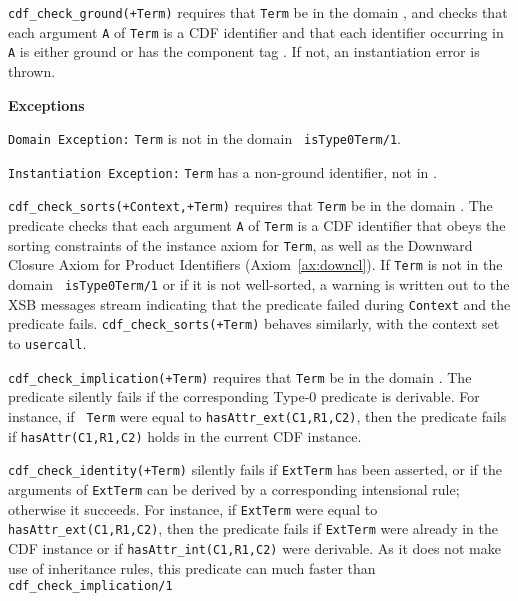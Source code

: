 \begin{description}
{\tt cdf\_check\_ground(+Term)} requires that {\tt Term} be in the
domain , and checks that each argument {\tt A}
of {\tt Term} is a CDF identifier and that each identifier occurring
in {\tt A} is either ground or has the component tag
.  If not, an instantiation error is thrown.

{\bf Exceptions} 

{\tt Domain Exception:} {\tt Term} is not in the domain {\tt
isType0Term/1}.

{\tt Instantiation Exception:} {\tt Term} has a non-ground identifier,
not in .



{\tt cdf\_check\_sorts(+Context,+Term)} requires that {\tt Term} be in
the domain .  The predicate checks that each
argument {\tt A} of {\tt Term} is a CDF identifier that obeys the
sorting constraints of the instance axiom for {\tt Term}, as well as
the Downward Closure Axiom for Product Identifiers
(Axiom~\ref{ax:downcl}).  If {\tt Term} is not in the domain {\tt
isType0Term/1} or if it is not well-sorted, a warning is written out
to the XSB messages stream indicating that the predicate failed during
{\tt Context} and the predicate fails.  {\tt cdf\_check\_sorts(+Term)}
behaves similarly, with the context set to {\tt usercall}.

{\tt cdf\_check\_implication(+Term)} requires that {\tt Term} be in
the domain .  The predicate silently fails if the
corresponding Type-0 predicate is derivable.  For instance, if {\tt
Term} were equal to {\tt hasAttr\_ext(C1,R1,C2)}, then the predicate
fails if {\tt hasAttr(C1,R1,C2)} holds in the current CDF instance.

{\tt cdf\_check\_identity(+Term)} silently fails if {\tt ExtTerm} has
been asserted, or if the arguments of {\tt ExtTerm} can be derived by
a corresponding intensional rule; otherwise it succeeds.  For
instance, if {\tt ExtTerm} were equal to {\tt hasAttr\_ext(C1,R1,C2)},
then the predicate fails if {\tt ExtTerm} were already in the CDF
instance or if {\tt hasAttr\_int(C1,R1,C2)} were derivable.  As it
does not make use of inheritance rules, this predicate can much faster
than {\tt cdf\_check\_implication/1}


\end{description}

